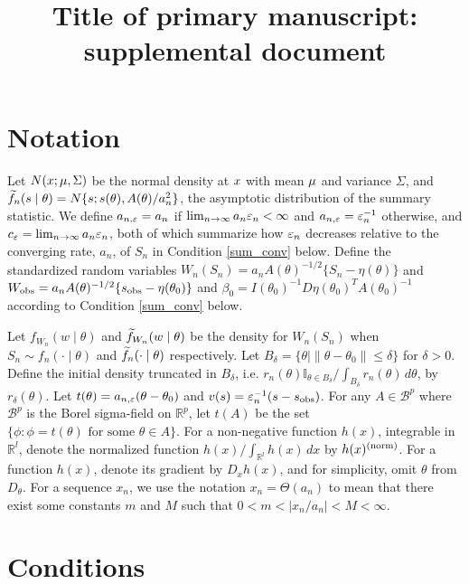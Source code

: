\documentclass[9pt]{article}
\title{Title of primary manuscript: supplemental document}
\author{}
\theoremstyle{remark}
\begin{document}
\maketitle


\section{Notation}
Let $N({}{x};{}{\mu},\Sigma)$ be the normal density at ${}{x}$
with mean ${}{\mu}$ and variance $\Sigma$, and $\widetilde{f}_{n}({}{s}\mid{}{\theta})=N\{{}{s};{}{s}({}{\theta}),A({}{\theta})/a_{n}^{2}\}$, the asymptotic distribution of the summary statistic.
We define $a_{n,\varepsilon}=a_{n}$ if $\lim_{n\rightarrow\infty}a_{n}\varepsilon_{n}<\infty$
and $a_{n,\varepsilon}=\varepsilon_{n}^{-1}$ otherwise, and $c_{\varepsilon}=\lim_{n\rightarrow\infty}a_{n}\varepsilon_{n}$,
both of which summarize how $\varepsilon_{n}$ decreases relative to the
converging rate, $a_{n}$, of $S_{n}$ in Condition \ref{sum_conv} below. Define
the standardized random variables $W_{n}(S_{n})=a_{n}A(\theta)^{-1/2}\{S_{n}-\eta(\theta)\}$
and $W_{\rm obs}=a_{n}A(\theta)^{-1/2}\{s_{\rm obs}-\eta(\theta_0)\}$ and $\beta_{0}=I(\theta_0)^{-1}D\eta(\theta_0)^{T}A(\theta_0)^{-1}$ according to Condition \ref{sum_conv} below. 

Let $f_{W_{n}}(w\mid\theta)$ and
$\widetilde{f}_{W_{n}}(w\mid\theta)$ be the density for $W_{n}(S_{n})$ when
$S_{n}\sim f_{n}(\cdot\mid\theta)$ and $\widetilde{f}_n(\cdot\mid\theta)$ respectively.
Let $B_{\delta}=\{\theta\mid\|\theta-\theta_{0}\|\leq\delta\}$ for
$\delta>0$. Define the initial density truncated in $B_{\delta}$,
i.e. $r_{n}(\theta)\mathbb{I}_{\theta\in B_{\delta}}/\int_{B_{\delta}}r_{n}(\theta)\,d\theta$,
by $r_{\delta}(\theta)$. Let $t(\theta)=a_{n,\varepsilon}(\theta-\theta_{0})$
and $v(s)=\varepsilon_{n}^{-1}(s - s_{\rm obs})$. For any $A\in\mathscr{B}^{p}$
where $\mathscr{B}^{p}$ is the Borel sigma-field on $\mathbb{R}^{p}$,
let $t(A)$ be the set $\{\phi:\phi=t(\theta)\text{ for some }\theta\in A\}$.
For a non-negative function $h(x)$, integrable in $\mathbb{R}^{l}$,
denote the normalized function $h(x)/\int_{\mathbb{R}^{l}}h(x)\,dx$
by $h(x)^{({\rm norm})}$. For a function $h(x)$, denote its gradient
by $D_{x}h(x)$, and for simplicity, omit $\theta$ from $D_{\theta}$. For a sequence $x_n$, we use the notation $x_n = \Theta(a_n)$ to mean that there exist some constants $m$ and $M$ such that $0<m<\mid x_n/a_n \mid<M<\infty$.


\section{Conditions}
\end{document}
